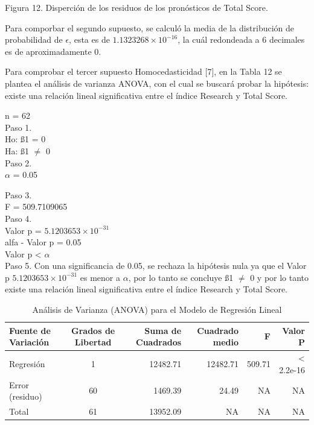 \documentclass[
]{article}
\begin{document}
\begin{multicols}{2}
Figura 12. Disperción de los residuos de los pronósticos de Total Score.



Para comporbar el segundo supuesto, se calculó la media de la distribución de probabilidad de $\epsilon$, esta es de \ensuremath{1.1323268\times 10^{-16}}, la cuál redondeada a 6 decimales es de aproximadamente 0.

Para comprobar el tercer supuesto Homocedasticidad [7], en la Tabla 12 se plantea el análisis de varianza ANOVA, con el cual se buscará probar la hipótesis: existe una relación lineal significativa entre el índice Research y Total Score.




n = 62\\
Paso 1.\\
Ho: ß1 = 0\\
Ha: ß1 $≠$ 0\\

Paso 2.\\
$\alpha$ = 0.05

Paso 3.\\
F = 509.7109065\\

Paso 4.\\
Valor p = \ensuremath{5.1203653\times 10^{-31}}\\
alfa - Valor p = 0.05\\
Valor p < $\alpha$\\

Paso 5.
Con una significancia de 0.05, se rechaza la hipótesis nula ya que el Valor p \ensuremath{5.1203653\times 10^{-31}} es menor a  $\alpha$, por lo tanto se concluye ß1 $≠$ 0 y por lo tanto existe una relación lineal significativa entre el índice Research y Total Score.


\end {multicols}

\renewcommand{\arraystretch}{1.3}
\begin{footnotesize}
\begin{longtable}[t]{lcrrrr}
\caption{\label{tab:tabla12}Análisis de Varianza (ANOVA) para el Modelo de Regresión Lineal}\\
\toprule
Fuente de Variación & Grados de Libertad & Suma de Cuadrados & Cuadrado medio & F & Valor P\\
\midrule
Regresión & 1 & 12482.71 & 12482.71 & 509.71 & < 2.2e-16\\
Error (residuo) & 60 & 1469.39 & 24.49 & NA & NA\\
Total & 61 & 13952.09 & NA & NA & NA\\
\bottomrule
\end{longtable}

\end{footnotesize}\renewcommand{\arraystretch}{1}
\end{document}

